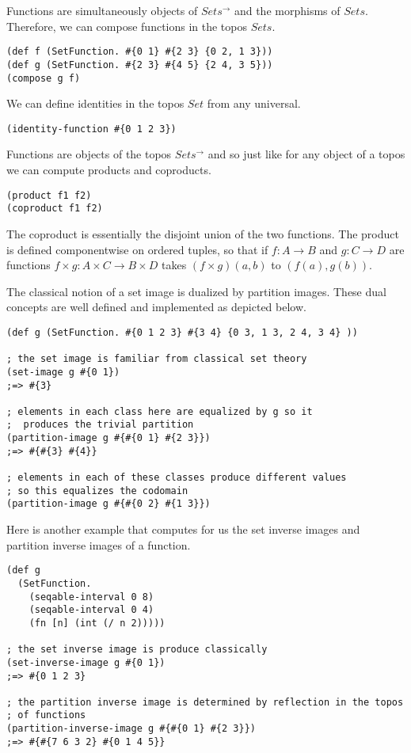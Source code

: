 \documentclass[a4paper,11pt]{report}
\begin{document}
Functions are simultaneously objects of $Sets^{\to}$ and the morphisms of $Sets$. Therefore, we can compose functions in the topos $Sets$.

\lstset {language=Lisp}
\begin{lstlisting}
(def f (SetFunction. #{0 1} #{2 3} {0 2, 1 3}))
(def g (SetFunction. #{2 3} #{4 5} {2 4, 3 5}))
(compose g f)
\end{lstlisting}

We can define identities in the topos $Set$ from any universal.

\lstset {language=Lisp}
\begin{lstlisting}
(identity-function #{0 1 2 3})
\end{lstlisting}

Functions are objects of the topos $Sets^{\to}$ and so just like for any object of a topos we can compute products and coproducts.

\lstset {language=Lisp}
\begin{lstlisting}
(product f1 f2)
(coproduct f1 f2)
\end{lstlisting}

The coproduct is essentially the disjoint union of the two functions. The product is defined componentwise on ordered tuples, so that if $f: A \to B$ and $g : C \to D$ are functions $f \times g : A \times C \to B \times D$ takes $(f \times g)(a,b)$ to $(f(a),g(b))$. 

\newpage 

The classical notion of a set image is dualized by partition images. These dual concepts are well defined and implemented as depicted below.

\lstset {language=Lisp}
\begin{lstlisting}
(def g (SetFunction. #{0 1 2 3} #{3 4} {0 3, 1 3, 2 4, 3 4} ))

; the set image is familiar from classical set theory
(set-image g #{0 1})
;=> #{3}

; elements in each class here are equalized by g so it
;  produces the trivial partition
(partition-image g #{#{0 1} #{2 3}})
;=> #{#{3} #{4}}

; elements in each of these classes produce different values
; so this equalizes the codomain 
(partition-image g #{#{0 2} #{1 3}})
\end{lstlisting}

Here is another example that computes for us the set inverse images and partition inverse images of a function.

\lstset {language=Lisp}
\begin{lstlisting}
(def g
  (SetFunction. 
    (seqable-interval 0 8) 
    (seqable-interval 0 4) 
    (fn [n] (int (/ n 2)))))

; the set inverse image is produce classically
(set-inverse-image g #{0 1})
;=> #{0 1 2 3}

; the partition inverse image is determined by reflection in the topos 
; of functions
(partition-inverse-image g #{#{0 1} #{2 3}})
;=> #{#{7 6 3 2} #{0 1 4 5}}
\end{lstlisting}
\end{document}
